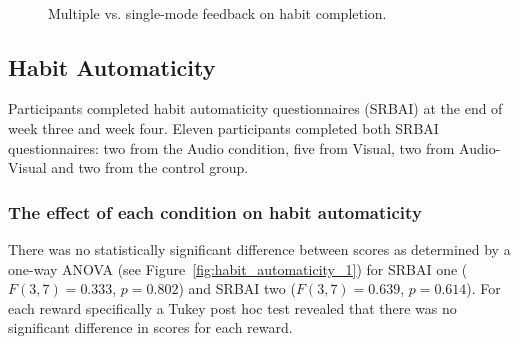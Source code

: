 \documentclass{scaffold/sigchi}
\begin{document}
\begin{figure}
  \centering
  \caption{Multiple vs. single-mode feedback on habit completion.}~\label{fig:habit_completion_3}
\end{figure}


\subsection{Habit Automaticity}
Participants completed habit automaticity questionnaires (SRBAI) at the end of week three and week four. Eleven participants completed both SRBAI questionnaires: two from the Audio condition, five from Visual, two from Audio-Visual and two from the control group.




\subsubsection{The effect of each condition on habit automaticity}
There was no statistically significant difference between scores as determined by a one-way ANOVA (see Figure~\ref{fig:habit_automaticity_1}) for SRBAI one ($F(3,7) = 0.333$, $p = 0.802$) and SRBAI two ($F(3,7) = 0.639$, $p = 0.614$). For each reward specifically a Tukey post hoc test revealed that there was no significant difference in scores for each reward.
\end{document}
